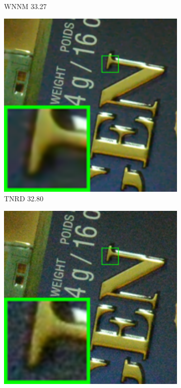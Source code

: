 \begin{figure}
\begin{subfigure}[t]{0.19\textwidth}
\caption{WNNM 33.27}
    \end{subfigure}
    \hfill
    \begin{subfigure}[t]{0.19\textwidth}
        \centering
        \includegraphics[width=1\textwidth]{images/twsc/cc/resize_br_TRD_d800_iso6400_1_real.png}
\caption{TNRD 32.80}
    \end{subfigure}
    \hfill
    \begin{subfigure}[t]{0.19\textwidth}
        \centering
        \includegraphics[width=1\textwidth]{images/twsc/cc/resize_br_DnCNN_d800_iso6400_1_real.png}

\end{subfigure}
\end{figure}
